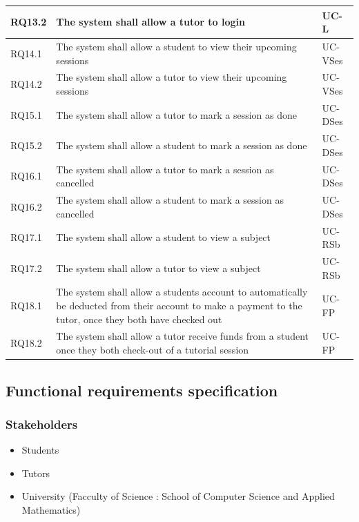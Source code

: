 \documentclass[12pt]{article}
\begin{document}
{\begin{longtable}{| l | p{10cm}| l |}
				RQ13.2 & The system shall allow a tutor to login &UC-L\\ \hline
				RQ14.1 & The system shall allow a student to view their upcoming sessions  &UC-VSes\\ \hline
				RQ14.2 & The system shall allow a tutor to view their upcoming sessions  &UC-VSes\\ \hline
				RQ15.1 & The system shall allow a tutor to mark a session as done &UC-DSes\\ \hline
				RQ15.2 & The system shall allow a student to mark a session as done &UC-DSes\\ \hline
				RQ16.1 & The system shall allow a tutor to mark a session as cancelled &UC-DSes\\ \hline
				RQ16.2 & The system shall allow a student to mark a session as cancelled &UC-DSes\\ \hline
				RQ17.1 & The system shall allow a student to view a subject &UC-RSb\\ \hline
				RQ17.2 & The system shall allow a tutor to view a subject &UC-RSb\\ \hline
				RQ18.1 & The system shall allow a students account to automatically be deducted from their account to make a payment to the tutor, once they both have checked out  &UC-FP\\ \hline
				RQ18.2 & The system shall allow a tutor receive funds from a student once they both check-out of a tutorial session &UC-FP\\ \hline
\end{longtable}
}
\newpage
\subsection{Functional requirements specification}
\subsubsection{Stakeholders}
\begin{itemize}
\item Students
\item Tutors
\item University (Facculty of Science : School of Computer Science and Applied Mathematics)
\end{itemize}
\end{document}

